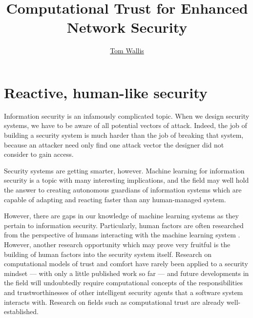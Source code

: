 \documentclass{tufte-handout}
\title{Computational Trust for Enhanced Network Security}
\author[Tom Wallis]{\href{http://tomwallis.net}{Tom Wallis}}
\date{}  %
\begin{document}
\maketitle%

\bigskip

\section{Reactive, human-like security}
Information security is an infamously complicated topic. When we design security systems, we have to be aware of all potential vectors of attack. Indeed, the job of building a security system is much harder than the job of breaking that system, because an attacker need only find one attack vector the designer did not consider to gain access. \par

Security systems are getting smarter, however. Machine learning for information security is a topic with many interesting implications, and the field may well hold the answer to creating autonomous guardians of information systems which are capable of adapting and reacting faster than any human-managed system. \par

However, there are gaps in our knowledge of machine learning systems as they pertain to information security. Particularly, human factors are often researched from the perspective of humans interacting with the machine learning system \cite{Barreno06canmachine}. However, another research opportunity which may prove very fruitful is the building of human factors into the security system itself. Research on computational models of trust and comfort have rarely been applied to a security mindset --- with only a little published work so far \cite{nokiaresearch} --- and future developments in the field will undoubtedly require computational concepts of
the responsibilities and trustworthinesses of other intelligent security agents that a software system interacts with. Research on fields such as computational trust are already well-established. \par
\end{document}
